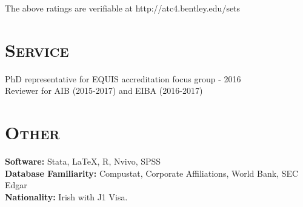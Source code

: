 \documentclass[margin, 12pt]{res}
\begin{document}
\begin{resume}
\begin{table}[htbp]
\begin{tabular}{lrr}
    \end{tabular}%
    
  The above ratings are verifiable at http://atc4.bentley.edu/sets    
  \label{tab:addlabel}%
\end{table}%
 
 \section{\normalfont\textsc{Service}}
PhD representative for EQUIS accreditation focus group - 2016 \\
Reviewer for AIB (2015-2017) and EIBA (2016-2017)




 
\section{\normalfont\textsc{Other}}
\textbf{Software:} Stata, \LaTeX, R, Nvivo, SPSS \\
\textbf{Database Familiarity:} Compustat, Corporate Affiliations, World Bank, SEC Edgar   \\
\textbf{Nationality:} Irish with J1 Visa. \\

\end{resume}
\end{document}
